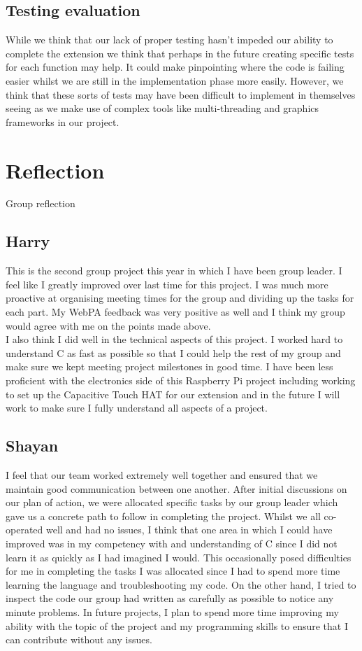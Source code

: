 \documentclass[11pt]{article}
\begin{document}
\subsection{Testing evaluation}
While we think that our lack of proper testing hasn't impeded our ability to complete the extension we think that perhaps in the future creating specific tests for each function may help. It could make pinpointing where the code is failing easier whilst we are still in the implementation phase more easily. However, we think that these sorts of tests may have been difficult to implement in themselves seeing as we make use of complex tools like multi-threading and graphics frameworks in our project.

\section{Reflection}
Group reflection

\subsection{Harry}
This is the second group project this year in which I have been group leader. I feel like I greatly improved over last time for this project. I was much more proactive at organising meeting times for the group and dividing up the tasks for each part. My WebPA feedback was very positive as well and I think my group would agree with me on the points made above.\\

 I also think I did well in the technical aspects of this project. I worked hard to understand C as fast as possible so that I could help the rest of my group and make sure we kept meeting project milestones in good time. I have been less proficient with the electronics side of this Raspberry Pi project including working to set up the Capacitive Touch HAT for our extension and in the future I will work to make sure I fully understand all aspects of a project.

\subsection{Shayan}
I feel that our team worked extremely well together and ensured that we maintain good communication between one another. After initial discussions on our plan of action, we were allocated specific tasks by our group leader which gave us a concrete path to follow in completing the project. Whilst we all co-operated well and had no issues, I think that one area in which I could have improved was in my competency with and understanding of C since I did not learn it as quickly as I had imagined I would. This occasionally posed difficulties for me in completing the tasks I was allocated since I had to spend more time learning the language and troubleshooting my code. On the other hand, I tried to inspect the code our group had written as carefully as possible to notice any minute problems. In future projects, I plan to spend more time improving my ability with the topic of the project and my programming skills to ensure that I can contribute without any issues.  
\end{document}
